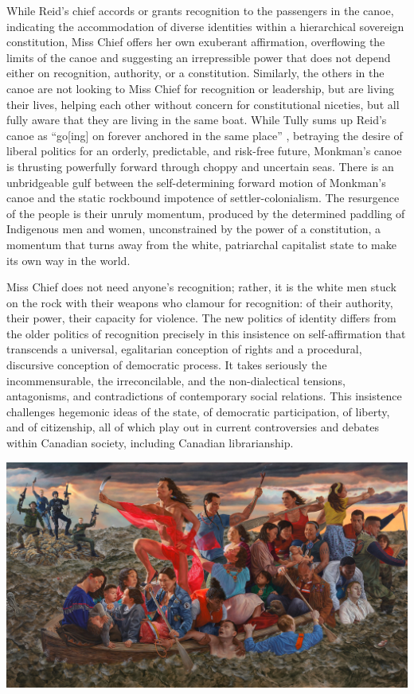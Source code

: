 \documentclass[12pt,oneside]{memoir}
\begin{document}
While Reid’s chief accords or grants recognition to the passengers in the canoe, indicating the accommodation of diverse identities within a hierarchical sovereign constitution, Miss Chief offers her own exuberant affirmation, overflowing the limits of the canoe and suggesting an irrepressible power that does not depend either on recognition, authority, or a constitution. Similarly, the others in the canoe are not looking to Miss Chief for recognition or leadership, but are living their lives, helping each other without concern for constitutional niceties, but all fully aware that they are living in the same boat. While Tully sums up Reid’s canoe as “go[ing] on forever anchored in the same place” \citep[33]{Tully1995}, betraying the desire of liberal politics for an orderly, predictable, and risk-free future, Monkman’s canoe is thrusting powerfully forward through choppy and uncertain seas. There is an unbridgeable gulf between the self-determining forward motion of Monkman’s canoe and the static rockbound impotence of settler-colonialism. The resurgence of the people is their unruly momentum, produced by the determined paddling of Indigenous men and women, unconstrained by the power of a constitution, a momentum that turns away from the white, patriarchal capitalist state to make its own way in the world.

Miss Chief does not need anyone’s recognition; rather, it is the white men stuck on the rock with their weapons who clamour for recognition: of their authority, their power, their capacity for violence. The new politics of identity differs from the older politics of recognition precisely in this insistence on self-affirmation that transcends a universal, egalitarian conception of rights and a procedural, discursive conception of democratic process. It takes seriously the incommensurable, the irreconcilable, and the non-dialectical tensions, antagonisms, and contradictions of contemporary social relations. This insistence challenges hegemonic ideas of the state, of democratic participation, of liberty, and of citizenship, all of which play out in current controversies and debates within Canadian society, including Canadian librarianship. 

\bigskip

\includegraphics{resurgence}
\end{document}
